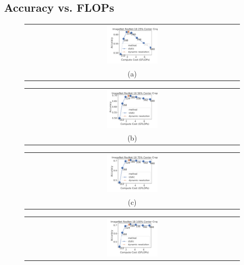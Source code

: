 \subsection{Accuracy vs. FLOPs}
\label{sec:accflops}
\begin{figure}[t]
    \centering
    \begin{tabular}{@{}c@{}}
    \includegraphics[width=0.245\textwidth]{e2e_figures/imagenet_resnet18_25_center.pdf} \\
    \small (a)
    \end{tabular}
    \begin{tabular}{@{}c@{}}
    \includegraphics[width=0.245\textwidth]{e2e_figures/imagenet_resnet18_56_center.pdf} \\
    \small (b)
    \end{tabular}
    \begin{tabular}{@{}c@{}}
    \includegraphics[width=0.245\textwidth]{e2e_figures/imagenet_resnet18_default_center.pdf} \\
    \small (c)
    \end{tabular}
    \begin{tabular}{@{}c@{}}
    \includegraphics[width=0.245\textwidth]{e2e_figures/imagenet_resnet18_full_center.pdf} \\

\end{tabular}
\end{figure}

